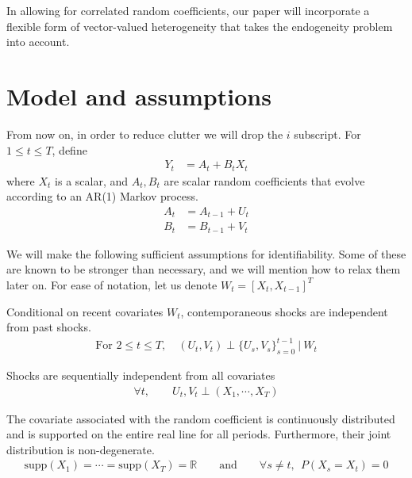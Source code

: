 In allowing for correlated random coefficients, our paper will incorporate a flexible form of vector-valued heterogeneity that takes the endogeneity problem into account.





\section{Model and assumptions}

From now on, in order to reduce clutter we will drop the $i$ subscript. For $1 \leq t \leq T$, define
\begin{align*}
Y_{t} &= A_{t} + B_{t}X_{t}
\end{align*}
where $X_{t}$ is a scalar, and $A_{t}, B_{t}$ are scalar random coefficients that evolve according to an AR(1) Markov process.
\begin{align}
  A_{t} &= A_{t-1} + U_{t} \\
  B_{t} &= B_{t-1} + V_{t}  
\end{align}

We will make the following sufficient assumptions for identifiability. Some of these are known to be stronger than necessary, and we will mention how to relax them later on. For ease of notation, let us denote $W_t = [X_t, X_{t-1}]^{T}$

\begin{assumption}{} \label{a:timeindependence}
  Conditional on recent covariates $W_t$, contemporaneous shocks are independent from past shocks.
  \begin{align}
    \text{For }2 \leq t \leq T ,
    \quad     
    (U_t, V_t) \perp \{ U_s, V_s \}_{s=0}^{t-1} \  | \ W_t
  \end{align}
\end{assumption}


\begin{assumption}{} \label{a:sequentialindependence}
  Shocks are sequentially independent from all covariates
  \begin{align}
    \forall t, \qquad U_t, V_t \perp (X_{1}, \cdots, X_{T})
  \end{align}
\end{assumption}


\begin{assumption}{}  \label{a:support}
  The covariate associated with the random coefficient is continuously distributed and is supported on the entire real line for all periods. Furthermore, their joint distribution is non-degenerate.
  \begin{align}
    \text{supp}(X_1) = \cdots = \text{supp}(X_T) = \mathbb{R} \qquad \text{and} \qquad \forall s \neq t, \ \ P(X_s = X_t) = 0 
  \end{align}
\end{assumption}


